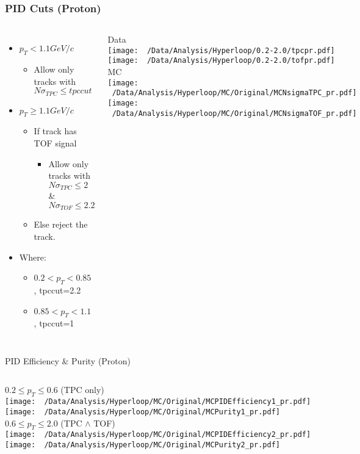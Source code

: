 \documentclass{beamer}
\begin{document}
\begin{frame}
	\frametitle{PID Cuts (Proton)}
	\begin{columns}
		\begin{itemize}
			\item $p_T<1.1GeV/c$
			\begin{itemize}
				\item Allow only tracks with $N\sigma_{TPC} \leq tpccut$
			\end{itemize}
			\item $p_T\geq 1.1GeV/c$
			\begin{itemize}
				\item If track has TOF signal
				\begin{itemize}
					\item Allow  only tracks with $N\sigma_{TPC} \leq 2$ \& $N\sigma_{TOF}\leq 2.2$
				\end{itemize}
				\item Else reject the track.
			\end{itemize}
			\item Where:	
			\begin{itemize}
				\item $0.2<p_T<0.85$ , tpccut=2.2
				\item $0.85<p_T<1.1$ , tpccut=1
			\end{itemize}
		\end{itemize}
		\centering
		{\tiny Data}\\
		\texttt{[image: ~/Data/Analysis/Hyperloop/0.2-2.0/tpcpr.pdf]}\\
		\texttt{[image: ~/Data/Analysis/Hyperloop/0.2-2.0/tofpr.pdf]}\\
		{\tiny MC}\\
		\texttt{[image: ~/Data/Analysis/Hyperloop/MC/Original/MCNsigmaTPC\_pr.pdf]}\\
		\texttt{[image: ~/Data/Analysis/Hyperloop/MC/Original/MCNsigmaTOF\_pr.pdf]}\\
	\end{columns}
\end{frame}
\begin{frame}{PID Efficiency \& Purity (Proton)}
	\begin{columns}
		\centering
		$0.2\leq p_T \leq 0.6$ (TPC only)\\
		\texttt{[image: ~/Data/Analysis/Hyperloop/MC/Original/MCPIDEfficiency1\_pr.pdf]}\\
		\texttt{[image: ~/Data/Analysis/Hyperloop/MC/Original/MCPurity1\_pr.pdf]}
		\centering
		$0.6\leq p_T \leq 2.0$ (TPC $\land$ TOF)\\
		\texttt{[image: ~/Data/Analysis/Hyperloop/MC/Original/MCPIDEfficiency2\_pr.pdf]}\\
		\texttt{[image: ~/Data/Analysis/Hyperloop/MC/Original/MCPurity2\_pr.pdf]}
	\end{columns}
\end{frame}
\end{document}

